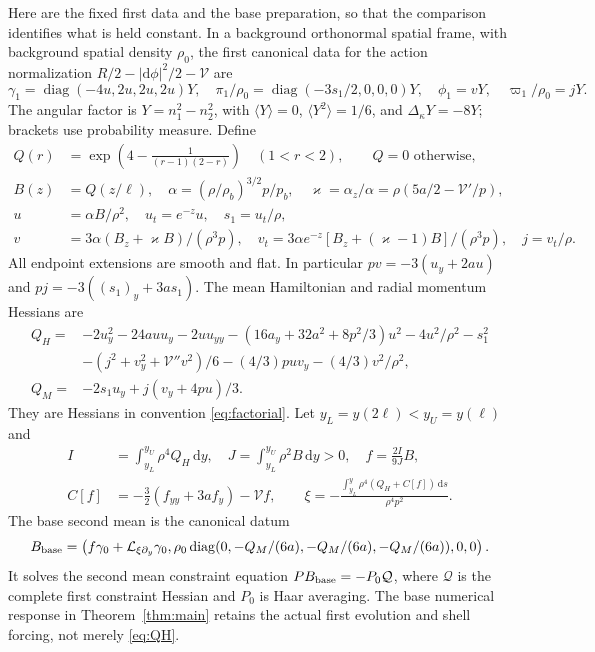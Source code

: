 \documentclass[11pt]{article}
\newcommand{\dd}{\mathrm d}
\newcommand{\Lie}{\mathcal L}
\newcommand{\av}[1]{\langle #1\rangle}
\newcommand{\cV}{\mathcal V}
\begin{document}
Here are the fixed first data and the base preparation, so that the
comparison identifies what is held constant. In a background orthonormal
spatial frame, with background spatial density $\rho_0$, the first
canonical data for the action normalization
$R/2-|\dd\phi|^2/2-\cV$ are
\begin{equation}
 \gamma_1=\operatorname{diag}(-4u,2u,2u,2u)Y,\quad
 \pi_1/\rho_0=\operatorname{diag}(-3s_1/2,0,0,0)Y,\quad
 \phi_1=vY,\quad\varpi_1/\rho_0=jY. \label{eq:first}
\end{equation}
The angular factor is $Y=n_1^2-n_2^2$, with
$\av Y=0$, $\av{Y^2}=1/6$, and $\Delta_\kappa Y=-8Y$; brackets use
probability measure. Define
\begin{align}
 Q(r)&=\exp\!\left(4-\frac1{(r-1)(2-r)}\right)\quad(1<r<2),
 \qquad Q=0\text{ otherwise},\label{eq:Q}\\
 B(z)&=Q(z/\ell),\quad
 \alpha=(\rho/\rho_b)^{3/2}p/p_b,\quad
 \varkappa=\alpha_z/\alpha=\rho(5a/2-\cV'/p),\nonumber\\
 u&=\alpha B/\rho^2,\quad u_t=e^{-z}u,\quad s_1=u_t/\rho,\nonumber\\
 v&=3\alpha(B_z+\varkappa B)/(\rho^3p),\quad
 v_t=3\alpha e^{-z}[B_z+(\varkappa-1)B]/(\rho^3p),\quad j=v_t/\rho.
 \nonumber
\end{align}
All endpoint extensions are smooth and flat. In particular
$pv=-3(u_y+2au)$ and $pj=-3((s_1)_y+3as_1)$.
The mean Hamiltonian and radial momentum Hessians are
\begin{align}
 Q_H={}&-2u_y^2-24auu_y-2uu_{yy}
 -(16a_y+32a^2+8p^2/3)u^2-4u^2/\rho^2-s_1^2\nonumber\\
 &-(j^2+v_y^2+\cV''v^2)/6-(4/3)puv_y-(4/3)v^2/\rho^2,
 \label{eq:QH}\\
 Q_M={}&-2s_1u_y+j(v_y+4pu)/3.\nonumber
\end{align}
They are Hessians in convention \eqref{eq:factorial}. Let
$y_L=y(2\ell)<y_U=y(\ell)$ and
\begin{align}
 I&=\int_{y_L}^{y_U}\rho^4Q_H\,\dd y,\quad
 J=\int_{y_L}^{y_U}\rho^2 B\,\dd y>0,\quad f=\frac{2I}{9J}B,
 \nonumber\\
 C[f]&=-\tfrac32(f_{yy}+3af_y)-\cV f,\qquad
 \xi=-\frac{\int_{y_L}^y\rho^4(Q_H+C[f])\,\dd s}{\rho^4p^2}.
 \label{eq:base}
\end{align}
The base second mean is the canonical datum
\begin{equation}
 B_{\rm base}=\left(f\gamma_0+\Lie_{\xi\partial_y}\gamma_0,
 \rho_0\operatorname{diag}(0,-Q_M/(6a),-Q_M/(6a),-Q_M/(6a)),0,0\right).
 \label{eq:Bbase}
\end{equation}
It solves the second mean constraint equation $PB_{\rm base}=-P_0\mathcal Q$,
where $\mathcal Q$ is the complete first constraint Hessian and $P_0$ is
Haar averaging. The base numerical response in Theorem~\ref{thm:main}
retains the actual first evolution and shell forcing, not merely
\eqref{eq:QH}.
\end{document}
